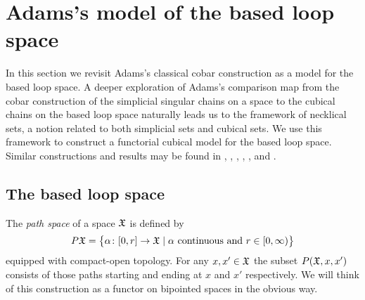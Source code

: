 
\section{Adams's model of the based loop space}\label{s:theorem1}

In this section we revisit Adams's classical cobar construction as a model for the based loop space.
A deeper exploration of Adams's comparison map from the cobar construction of the simplicial singular chains on a space to the cubical chains on the based loop space naturally leads us to the framework of necklical sets, a notion related to both simplicial sets and cubical sets.
We use this framework to construct a functorial cubical model for the based loop space.
Similar constructions and results may be found in \cite{baues1980geometry}, \cite{berger1995loops}, \cite{baues1998hopf}, \cite{dugger2011rigidification}, \cite{galvez2020hopf}, and \cite{rivera2018cubical, rivera2019path}.

%

\subsection{The based loop space}

The \textit{path space} of a space $\mathfrak{X}$ is defined by
\[
P\mathfrak{X} = \big\{\alpha \colon [0,r] \to \mathfrak{X} \mid \text{$\alpha$ continuous and } r \in [0,\infty)\big\}
\]
equipped with compact-open topology.
For any $x,x' \in \mathfrak{X}$ the subset $P(\mathfrak{X}, x, x')$ consists of those paths starting and ending at $x$ and $x'$ respectively.
We will think of this construction as a functor on bipointed spaces in the obvious way.


